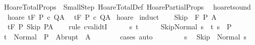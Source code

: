 %
\begin{isabellebody}%
%
%
\isamarkuptrue%
%
\isadelimtheory
%
\endisadelimtheory
%
\isatagtheory
{}\isamarkupfalse%
\ HoareTotalProps\ \ SmallStep\ HoareTotalDef\ HoarePartialProps\ %
\endisatagtheory
{\isafoldtheory}%
%
\isadelimtheory
%
\endisadelimtheory
%
\isamarkuptrue%
\isamarkupfalse%
\ hoaret{\isacharunderscore}sound{\isacharcolon}\ \isanewline
\ \ hoare{\isacharcolon}\ {\isachardoublequoteopen}{\isasymGamma}{\isacharcomma}{\isasymTheta}{\isasymturnstile}\isactrlsub t\isactrlbsub {\isacharslash}F\isactrlesub \ P\ c\ Q{\isacharcomma}A{\isachardoublequoteclose}\isanewline
\ \ {\isachardoublequoteopen}{\isasymGamma}{\isacharcomma}{\isasymTheta}{\isasymTurnstile}\isactrlsub t\isactrlbsub {\isacharslash}F\isactrlesub \ P\ c\ Q{\isacharcomma}A{\isachardoublequoteclose}\isanewline
%
\isadelimproof
%
\endisadelimproof
%
\isatagproof
{}\isamarkupfalse%
\ hoare\isanewline
{}\isamarkupfalse%
\ {\isacharparenleft}induct{\isacharparenright}\isanewline
\ \ \isamarkupfalse%
\ {\isacharparenleft}Skip\ {\isasymTheta}\ F\ P\ A{\isacharparenright}\isanewline
\ \ \isamarkupfalse%
\ {\isachardoublequoteopen}{\isasymGamma}{\isacharcomma}{\isasymTheta}\ {\isasymTurnstile}\isactrlsub t\isactrlbsub {\isacharslash}F\isactrlesub \ P\ Skip\ P{\isacharcomma}A{\isachardoublequoteclose}\isanewline
\ \ \isamarkupfalse%
\ {\isacharparenleft}rule\ cvalidtI{\isacharparenright}\isanewline
\ \ \ \ \isamarkupfalse%
\ s\ t\isanewline
\ \ \ \ \isamarkupfalse%
\ {\isachardoublequoteopen}{\isasymGamma}{\isasymturnstile}{\isasymlangle}Skip{\isacharcomma}Normal\ s{\isasymrangle}\ {\isasymRightarrow}\ t{\isachardoublequoteclose}\ {\isachardoublequoteopen}s\ {\isasymin}\ P{\isachardoublequoteclose}\isanewline
\ \ \ \ \isamarkupfalse%
\ {\isachardoublequoteopen}t\ {\isasymin}\ Normal\ {\isacharbackquote}\ P\ {\isasymunion}\ Abrupt\ {\isacharbackquote}\ A{\isachardoublequoteclose}\isanewline
\ \ \ \ \ \ \isamarkupfalse%
\ cases\ auto\isanewline
\ \ \isamarkupfalse%
\isanewline
\ \ \ \ \isamarkupfalse%
\ s\ \isamarkupfalse%
\ {\isachardoublequoteopen}{\isasymGamma}{\isasymturnstile}Skip\ {\isasymdown}\ Normal\ s{\isachardoublequoteclose}\isanewline

\end{isabellebody}

